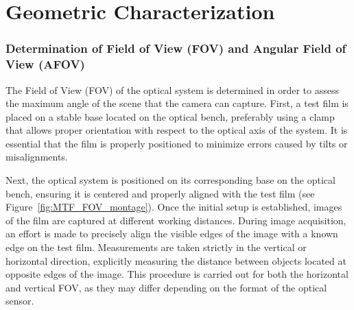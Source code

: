 


\section{Geometric Characterization}

\subsubsection{Determination of Field of View (FOV) and Angular Field of View (AFOV)}
\label{sec:fov}

The Field of View (FOV) of the optical system is determined in order to assess the maximum angle of the scene that the camera can capture. First, a test film is placed on a stable base located on the optical bench, preferably using a clamp that allows proper orientation with respect to the optical axis of the system. It is essential that the film is properly positioned to minimize errors caused by tilts or misalignments.

Next, the optical system is positioned on its corresponding base on the optical bench, ensuring it is centered and properly aligned with the test film (see Figure~\ref{fig:MTF_FOV_montage}). Once the initial setup is established, images of the film are captured at different working distances. During image acquisition, an effort is made to precisely align the visible edges of the image with a known edge on the test film. Measurements are taken strictly in the vertical or horizontal direction, explicitly measuring the distance between objects located at opposite edges of the image. This procedure is carried out for both the horizontal and vertical FOV, as they may differ depending on the format of the optical sensor.

